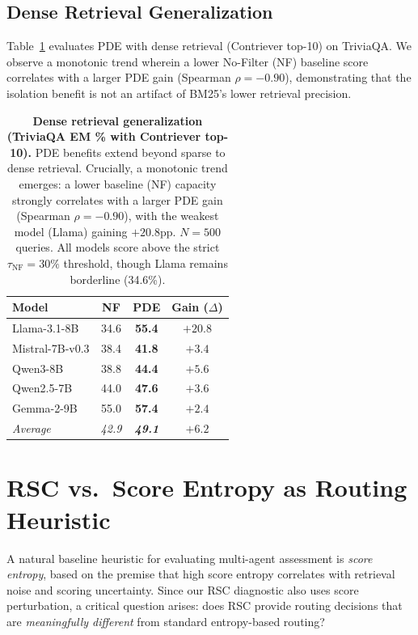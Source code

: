 \documentclass[11pt]{article}
\theoremstyle{definition}
\begin{document}
\subsection{Dense Retrieval Generalization}
\label{sec:appendix-dense-tqa}

Table~\ref{tab:dense-tqa} evaluates PDE with dense retrieval (Contriever top-10) on TriviaQA. We observe a monotonic trend wherein a lower No-Filter (NF) baseline score correlates with a larger PDE gain (Spearman \(\rho = -0.90\)), demonstrating that the isolation benefit is not an artifact of BM25's lower retrieval precision.

\begin{table}[ht]
\centering
\small
\begin{tabular}{@{}l ccc@{}}
\toprule
\textbf{Model} & \textbf{NF} & \textbf{PDE} & \textbf{Gain (\(\Delta\))} \\
\midrule
Llama-3.1-8B    & 34.6 & \textbf{55.4} & \(+20.8\) \\
Mistral-7B-v0.3 & 38.4 & \textbf{41.8} & \(+3.4\) \\
Qwen3-8B        & 38.8 & \textbf{44.4} & \(+5.6\) \\
Qwen2.5-7B      & 44.0 & \textbf{47.6} & \(+3.6\) \\
Gemma-2-9B      & 55.0 & \textbf{57.4} & \(+2.4\) \\
\midrule
\textit{Average}  & \textit{42.9} & \textit{\textbf{49.1}} & \textit{\(+6.2\)} \\
\bottomrule
\end{tabular}
\caption{\textbf{Dense retrieval generalization (TriviaQA EM \% with Contriever top-10).} 
PDE benefits extend beyond sparse to dense retrieval. Crucially, a monotonic trend emerges: a lower baseline (NF) capacity strongly correlates with a larger PDE gain (Spearman \(\rho = -0.90\)), with the weakest model (Llama) gaining \(+20.8\)pp. \(N=500\) queries. All models score above the strict \(\tau_{\text{NF}}=30\%\) threshold, though Llama remains borderline (34.6\%).}
\label{tab:dense-tqa}
\end{table}


\section{RSC vs.\ Score Entropy as Routing Heuristic}
\label{sec:appendix-rsc-entropy}

A natural baseline heuristic for evaluating multi-agent assessment is \emph{score entropy}, based on the premise that high score entropy correlates with retrieval noise and scoring uncertainty.
Since our RSC diagnostic also uses score perturbation, a critical question arises: does RSC provide routing decisions that are \emph{meaningfully different} from standard entropy-based routing?
\end{document}
